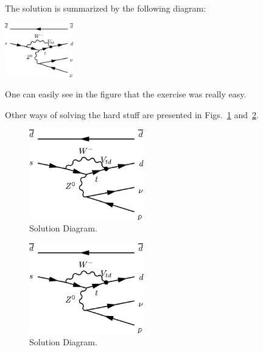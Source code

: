 \documentclass[11pt,a4paper]{article}
\begin{document}
\begin{solution} %
  The solution is summarized by the following diagram:
  \begin{center}
    \includegraphics[angle=90,width=30mm]{fig/penguin}
  \end{center}
  One can easily see in the figure that the exercise was really easy.

  Other ways of solving the hard stuff are presented in Figs.~\ref{fig:SolPenguin}
  and~\ref{fig:SolPenguin2}.
  \begin{figure}
    \centering
    \includegraphics[angle=35,width=50mm]{fig/penguin}
    \caption{Solution Diagram.}
    \label{fig:SolPenguin}
  \end{figure}
  \begin{figure}[b] %
    \centering
    \includegraphics[angle=235,width=50mm]{fig/penguin}
    \caption{Solution Diagram.}
    \label{fig:SolPenguin2}
  \end{figure}
\end{solution}
\end{document}
